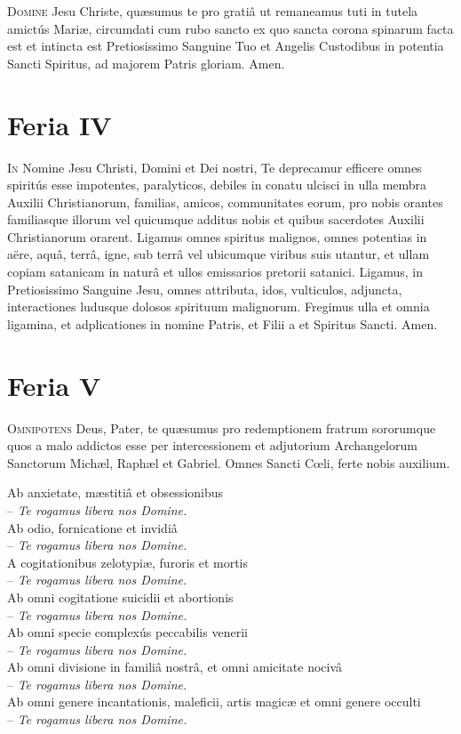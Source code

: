 \documentclass[9pt, twoside]{book}
\begin{document}
\lettrine{D}{omine} Jesu Christe, quæsumus te pro gratiâ ut remaneamus tuti in tutela
amictús Mariæ, circumdati cum rubo sancto ex quo sancta corona spinarum
facta est et intincta est Pretiosissimo Sanguine Tuo et Angelis Custodibus in
potentia Sancti Spiritus, ad majorem Patris gloriam. Amen.

\section{Feria IV}
\lettrine{I}{n} Nomine Jesu Christi, Domini et Dei nostri, Te deprecamur efficere omnes
spiritús esse impotentes, paralyticos, debiles in conatu ulcisci in ulla membra
Auxilii Christianorum, familias, amicos, communitates eorum, pro nobis
orantes familiasque illorum vel quicumque additus nobis et quibus sacerdotes
Auxilii Christianorum orarent. Ligamus omnes spiritus malignos, omnes
potentias in aëre, aquâ, terrâ, igne, sub terrâ vel ubicumque viribus suis
utantur, et ullam copiam satanicam in naturâ et ullos emissarios pretorii
satanici. Ligamus, in Pretiosissimo Sanguine Jesu, omnes attributa, idos,
vulticulos, adjuncta, interactiones ludusque dolosos spirituum malignorum.
Fregimus ulla et omnia ligamina, et adplicationes in nomine Patris, et Filii a
et Spiritus Sancti. Amen. 

\section{Feria V}

\lettrine{O}{mnipotens} Deus, Pater, te quæsumus pro redemptionem fratrum
sororumque quos a malo addictos esse per intercessionem et adjutorium
Archangelorum Sanctorum Michæl, Raphæl et Gabriel. Omnes Sancti Cœli,
ferte nobis auxilium.

{\RaggedRight
Ab anxietate, mæstitiâ et obsessionibus\\\tab -- \textit{Te rogamus libera nos Domine.}\\
Ab odio, fornicatione et invidiâ\\\tab -- \textit{Te rogamus libera nos Domine.}\\
\pagebreak
A cogitationibus zelotypiæ, furoris et mortis\\\tab -- \textit{Te rogamus libera nos Domine.}\\
Ab omni cogitatione suicidii et abortionis\\\tab -- \textit{Te rogamus libera nos Domine.}\\
Ab omni specie complexús peccabilis venerii\\\tab -- \textit{Te rogamus libera nos Domine.}\\
Ab omni divisione in familiâ nostrâ, et omni amicitate nocivâ\\\tab -- \textit{Te rogamus libera nos Domine.}\\
Ab omni genere incantationis, maleficii, artis magicæ et omni genere occulti\\\tab -- \textit{Te rogamus libera nos Domine.}
}
\ 
\end{document}
